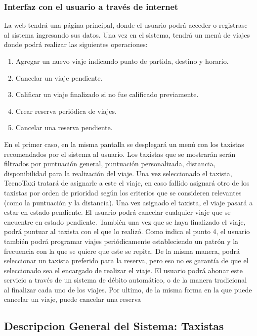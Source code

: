 	\subsubsection{Interfaz con el usuario a través de internet}
	La web tendrá una página principal, donde el usuario podrá acceder o registrase al sistema ingresando sus datos. Una vez en el sistema, tendrá un menú de viajes donde podrá realizar las siguientes operaciones:
	\begin{enumerate}
	\item Agregar un nuevo viaje indicando punto de partida, destino y horario.
	\item Cancelar un viaje pendiente.
	\item Calificar un viaje finalizado si no fue calificado previamente.
	\item Crear reserva periódica de viajes.
	\item Cancelar una reserva pendiente.
	\end{enumerate}
	En el primer caso, en la misma pantalla se desplegará un menú con los taxistas recomendados por el sistema al usuario. Los taxistas que se mostrarán serán filtrados por puntuación general, puntuación personalizada, distancia, disponibilidad para la realización del viaje. Una vez seleccionado el taxista, TecnoTaxi tratará de asignarle a este el viaje, en caso fallido asignará otro de los taxistas por orden de prioridad según los criterios que se consideren relevantes (como la puntuación y la distancia). Una vez asignado el taxista, el viaje pasará a estar en estado pendiente.
	El usuario podrá cancelar cualquier viaje que se encuentre en estado pendiente. También una vez que se haya finalizado el viaje, podrá puntuar al taxista con el que lo realizó.
	Como indica el punto 4, el usuario también podrá programar viajes periódicamente estableciendo un patrón y la frecuencia con la que se quiere que este se repita. De la misma manera, podrá seleccionar un taxista preferido para la reserva, pero eso no es garantía de que el seleccionado sea el encargado de realizar el viaje. El usuario podrá abonar este servicio a través de un sistema de débito automático, o de la manera tradicional al finalizar cada uno de los viajes. Por ultimo, de la misma forma en la que puede cancelar un viaje, puede cancelar una reserva

\subsection{Descripcion General del Sistema: Taxistas}
